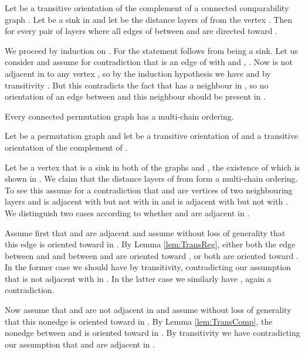 \documentclass[12pt]{llncs}
\begin{document}
\begin{lemma}\label{lem:TransComp}
Let 
be a transitive orientation of the complement of a connected comparability graph
. Let   be a sink in  and let  be the distance layers of
 from the vertex . Then for
every pair of layers  where  all edges
of  between  and  are directed
toward .
\end{lemma}
\begin{my_proof}
We proceed by induction on .  For  the statement follows from
 being a sink. Let us consider  and assume for contradiction
that  is an edge of 
with  and , . Now  is not adjacent in 
to any vertex , so by the induction hypothesis we have
 and by transitivity
. But this
contradicts the fact that  has a neighbour  in
, so no orientation of an edge between  and this neighbour
should be present in .
\end{my_proof}

\begin{theorem}\label{perm}
Every connected permutation graph has a multi-chain ordering.  
\end{theorem}
\begin{my_proof}
Let  be a permutation graph and let 
be a transitive orientation of  and 
a transitive orientation of the complement of .

Let  be a vertex that is a sink in both
of the graphs  and ,
the existence of which is shown in \cite{pnueli}.
We claim that the distance layers  of  from
 form a multi-chain ordering.  
To see this assume for a contradiction that 
and  are vertices of two neighbouring layers and
 is adjacent with  but not with 
in  and  is adjacent with  but not with .  We
distinguish two cases according to whether  and  are adjacent in
.

Assume first that  and  are adjacent and assume without loss of
generality that this edge is oriented
toward  in .
By Lemma \ref{lem:TransReg}, either both the edge between  and 
and between  and  are oriented toward , or both are
oriented toward .  In the former case we should have
 by transitivity,
contradicting our assumption that  is not adjacent with  in
. In the latter case we similarly have , again a contradiction.

Now assume that  and  are not adjacent in  and assume
without loss of generality that this nonedge
is oriented toward  in . By
Lemma \ref{lem:TransComp}, the nonedge between  and  is
oriented toward  in . By
transitivity we have  contradicting our assumption that  and  are adjacent in .
\end{my_proof}
\end{document}
